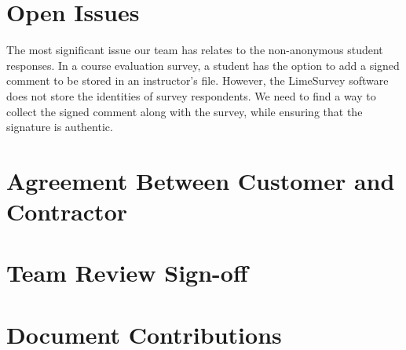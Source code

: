 \documentclass{article}
\begin{document}
\section{Open Issues}

The most significant issue our team has relates to the non-anonymous student responses. In a course evaluation survey, a student has the option to add a signed comment to be stored in an instructor's file. However, the LimeSurvey software does not store the identities of survey respondents. We need to find a way to collect the signed comment along with the survey, while ensuring that the signature is authentic.

\appendix

\newpage
\section{Agreement Between Customer and Contractor}
\newpage
\section{Team Review Sign-off}
\newpage
\section{Document Contributions}
\end{document}
